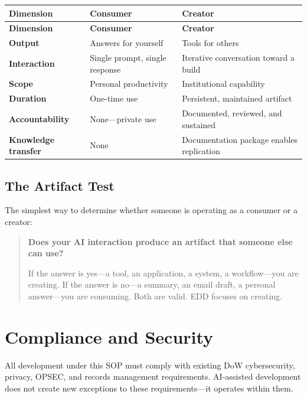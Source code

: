 \documentclass[11pt,letterpaper]{article}
\newenvironment{sopblockquote}{%
  \begin{quote}\itshape
}{%
  \end{quote}
}
\begin{document}
\begin{longtable}{@{}p{3cm}p{5cm}p{5.5cm}@{}}
\toprule
\textbf{Dimension} & \textbf{Consumer} & \textbf{Creator} \\
\midrule
\endfirsthead
\toprule
\textbf{Dimension} & \textbf{Consumer} & \textbf{Creator} \\
\midrule
\endhead
\bottomrule
\endlastfoot
\textbf{Output} & Answers for yourself & Tools for others \\
\midrule
\textbf{Interaction} & Single prompt, single response & Iterative conversation toward a build \\
\midrule
\textbf{Scope} & Personal productivity & Institutional capability \\
\midrule
\textbf{Duration} & One-time use & Persistent, maintained artifact \\
\midrule
\textbf{Accountability} & None---private use & Documented, reviewed, and sustained \\
\midrule
\textbf{Knowledge transfer} & None & Documentation package enables replication \\
\end{longtable}

\subsection{The Artifact Test}
\label{sec:artifact-test}

The simplest way to determine whether someone is operating as a consumer or a creator:

\begin{sopblockquote}
\textbf{Does your AI interaction produce an artifact that someone else can use?}

If the answer is yes---a tool, an application, a system, a workflow---you are creating.
If the answer is no---a summary, an email draft, a personal answer---you are consuming.
Both are valid. EDD focuses on creating.
\end{sopblockquote}

\section{Compliance and Security}
\label{sec:compliance-and-security}

All development under this SOP must comply with existing DoW cybersecurity, privacy,
OPSEC, and records management requirements. AI-assisted development does not create
new exceptions to these requirements---it operates within them.
\end{document}
